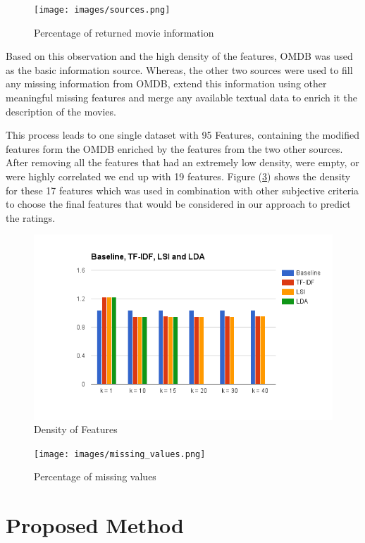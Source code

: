 \documentclass{sigish}
\begin{document}
\begin{figure}
\centering
\texttt{[image: images/sources.png]}
\caption{Percentage of returned movie information}
\label{fig:sources}
\end{figure}

Based on this observation and the high density of the features, OMDB was used as the basic information source. Whereas, the other two sources were used to fill any missing information from OMDB, extend this information using other meaningful missing features and merge any available textual data to enrich it the description of the movies.

This process leads to one single dataset with 95 Features, containing the modified features form the OMDB enriched by the features from the two other sources. After removing all the features that had an extremely low density, were empty, or were highly correlated we end up with 19 features. Figure (\ref{fig:density}) shows the density for these 17 features which was used in combination with other subjective criteria to choose the final features that would be considered in our approach to predict the ratings.

\begin{figure}
\centering
\includegraphics[width=\columnwidth]{images/density.png}
\caption{Density of Features}
\label{fig:density}
\end{figure}

\begin{figure}
\centering
\texttt{[image: images/missing\_values.png]}
\caption{Percentage of missing values}
\label{fig:density}
\end{figure}

\section{Proposed Method}
\end{document}
